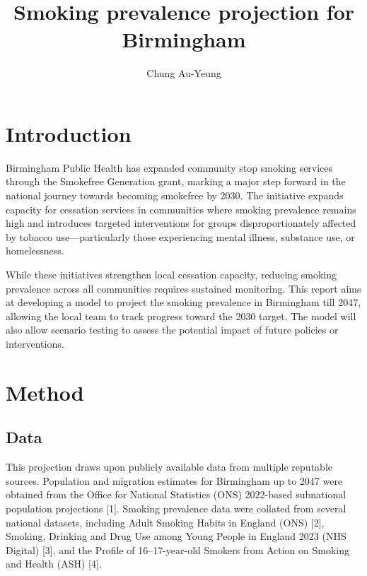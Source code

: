 \documentclass[
  letterpaper,
  DIV=11,
  numbers=noendperiod]{scrartcl}
\title{Smoking prevalence projection for Birmingham}
\author{Chung Au-Yeung}
\date{}
\renewcommand*\contentsname{Table of contents}
\newcommand\contentsname{Table of contents}
\begin{document}
\maketitle

\renewcommand*\contentsname{Table of contents}
{
\hypersetup{linkcolor=}
\setcounter{tocdepth}{3}
\tableofcontents
}

\section{Introduction}\label{introduction}

Birmingham Public Health has expanded community stop smoking services
through the Smokefree Generation grant, marking a major step forward in
the national journey towards becoming smokefree by 2030. The initiative
expands capacity for cessation services in communities where smoking
prevalence remains high and introduces targeted interventions for groups
disproportionately affected by tobacco use---particularly those
experiencing mental illness, substance use, or homelessness.

While these initiatives strengthen local cessation capacity, reducing
smoking prevalence across all communities requires sustained monitoring.
This report aims at developing a model to project the smoking prevalence
in Birmingham till 2047, allowing the local team to track progress
toward the 2030 target. The model will also allow scenario testing to
assess the potential impact of future policies or interventions.

\section{Method}\label{method}

\subsection{Data}\label{data}

This projection draws upon publicly available data from multiple
reputable sources. Population and migration estimates for Birmingham up
to 2047 were obtained from the Office for National Statistics (ONS)
2022-based subnational population projections {[}1{]}. Smoking
prevalence data were collated from several national datasets, including
Adult Smoking Habits in England (ONS) {[}2{]}, Smoking, Drinking and
Drug Use among Young People in England 2023 (NHS Digital) {[}3{]}, and
the Profile of 16--17-year-old Smokers from Action on Smoking and Health
(ASH) {[}4{]}.
\end{document}
